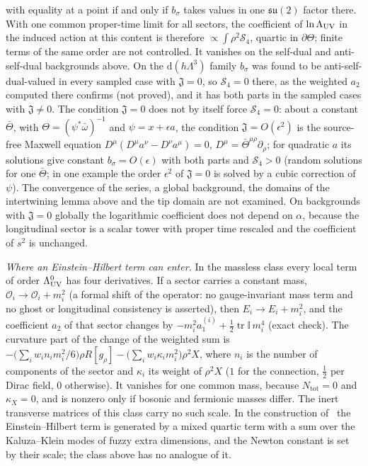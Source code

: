 with equality at a point if and only if \(b_\sigma\) takes values in one \(\mathfrak{su}(2)\) factor there. With one common proper-time limit for all sectors, the coefficient of \(\ln\Lambda_{\mathrm{UV}}\) in the induced action at this content is therefore \(\propto\int\rho^2\mathcal S_4\), quartic in \(\partial\Theta\); finite terms of the same order are not controlled. It vanishes on the self-dual and anti-self-dual backgrounds above. On the \(\mathrm d(h\Lambda^3)\) family \(b_\sigma\) was found to be anti-self-dual-valued in every sampled case with \(\mathfrak J=0\), so \(\mathcal S_4=0\) there, as the weighted \(a_2\) computed there confirms (not proved), and it has both parts in the sampled cases with \(\mathfrak J\ne0\). The condition \(\mathfrak J=0\) does not by itself force \(\mathcal S_4=0\): about a constant \(\bar\Theta\), with \(\Theta=(\psi^*\bar\omega)^{-1}\) and \(\psi=x+\epsilon a\), the condition \(\mathfrak J=O(\epsilon^2)\) is the source-free Maxwell equation \(D^\mu(D^\mu a^\nu-D^\nu a^\mu)=0\), \(D^\mu=\bar\Theta^{\mu\rho}\partial_\rho\); for quadratic \(a\) its solutions give constant \(b_\sigma=O(\epsilon)\) with both parts and \(\mathcal S_4>0\) (random solutions for one \(\bar\Theta\); in one example the order \(\epsilon^2\) of \(\mathfrak J=0\) is solved by a cubic correction of \(\psi\)). The convergence of the series, a global background, the domains of the intertwining lemma above and the tip domain are not examined. On backgrounds with \(\mathfrak J=0\) globally the logarithmic coefficient does not depend on \(\alpha\), because the longitudinal sector is a scalar tower with proper time rescaled and the coefficient of \(s^2\) is unchanged.

\emph{Where an Einstein--Hilbert term can enter.} In the massless class every local term of order \(\Lambda_{\mathrm{UV}}^0\) has four derivatives. If a sector carries a constant mass, \(\mathcal O_i\to\mathcal O_i+m_i^2\) (a formal shift of the operator: no gauge-invariant mass term and no ghost or longitudinal consistency is asserted), then \(E_i\to E_i+m_i^2\), and the coefficient \(a_2\) of that sector changes by \(-m_i^2a_1^{(i)}+\tfrac12\operatorname{tr}\mathbb I\,m_i^4\) (exact check). The curvature part of the change of the weighted sum is \(-\bigl(\sum_iw_in_im_i^2/6\bigr)\rho R[g_\rho]-\bigl(\sum_iw_i\kappa_im_i^2\bigr)\rho^2X\), where \(n_i\) is the number of components of the sector and \(\kappa_i\) its weight of \(\rho^2X\) (\(1\) for the connection, \(\tfrac12\) per Dirac field, \(0\) otherwise). It vanishes for one common mass, because \(N_{\mathrm{tot}}=0\) and \(\kappa_X=0\), and is nonzero only if bosonic and fermionic masses differ. The inert transverse matrices of this class carry no such scale. In the construction of~\cite{Steinacker2023} the Einstein--Hilbert term is generated by a mixed quartic term with a sum over the Kaluza--Klein modes of fuzzy extra dimensions, and the Newton constant is set by their scale; the class above has no analogue of it.

